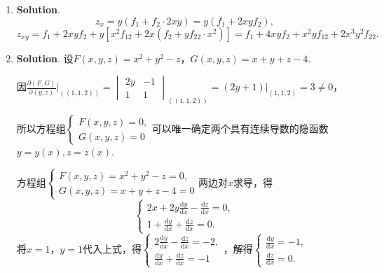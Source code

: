 \documentclass[../main.tex]{subfiles}
\begin{document}
\begin{enumerate}
    \item \textbf{Solution}.
          \[
              z_{x} = y\left(f_{1}+f_{2}\cdot 2xy\right)=y\left(f
                  _{1}+2x y f_{2}\right),
          \]
          \[
              z_{xy}= f_{1}+2xy f_{2} + y\left[x^{2}f_{12}+2x\left(f_{2}+yf_{22}\cdot x^{2}
                  \right)\right] = f_{1}+4xyf_{2} + x^{2}y f_{12}+ 2x^{3} y^{2} f_{22}.
          \]

    \item \textbf{Solution}. 设$F(x,y,z) = x^{2}+y^{2}-z$，$G(x,y,z)=x+y+z-4$.

          因$\frac{\partial (F,G)}{\partial (y,z)}\bigg|_{\left((1,1,2)\right)}=
              \begin{vmatrix}
                  2y & -1 \\
                  1  & 1
              \end{vmatrix}_{\left((1,1,2)\right)}=\left.(2y+1)\right|_{\left(1,1,2\right)}
              =3\neq 0$，

          所以方程组$\begin{cases}
                  F(x,y,z)=0, \\
                  G(x,y,z)=0
              \end{cases}$可以唯一确定两个具有连续导数的隐函数$y=y(x),z=z(x)$.

          方程组$\begin{cases}
                  F(x,y,z) = x^{2}+y^{2}-z=0, \\
                  G(x,y,z)=x+y+z-4=0
              \end{cases}$两边对$x$求导，得
          \[
              \begin{cases}
                  2x+2y\frac{\mathrm{d}y}{\mathrm{d}x}-\frac{\mathrm{d}z}{\mathrm{d}x}=0, \\[6pt]
                  1+\frac{\mathrm{d}y}{\mathrm{d}x}+\frac{\mathrm{d}z}{\mathrm{d}x}=0.
              \end{cases}
          \]
          将$x=1$，$y=1$代入上式，得$\begin{cases}
                  2\frac{\mathrm{d}y}{\mathrm{d}x}-\frac{\mathrm{d}z}{\mathrm{d}x}=-2, \\[6pt]
                  \frac{\mathrm{d}y}{\mathrm{d}x}+\frac{\mathrm{d}z}{\mathrm{d}x}=-1
              \end{cases}$，解得$\begin{cases}
                  \frac{\mathrm{d}y}{\mathrm{d}x}= -1, \\[6pt]
                  \frac{\mathrm{d}z}{\mathrm{d}x}= 0.
              \end{cases}$


\end{enumerate}
\end{document}
